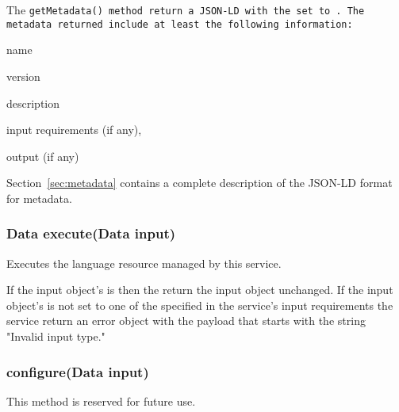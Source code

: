 The \tt{getMetadata()} method \should return a JSON-LD \payload with the \discriminator set to . The metadata returned \should include at least the following information:
\begin{listing}
	\item name
	\item version
	\item description
	\item input requirements (if any),
	\item output (if any)
\end{listing}
Section~\ref{sec:metadata} contains a complete description of the JSON-LD format for \lapps metadata.

\subsubsection{Data execute(Data input)}


Executes the language resource managed by this service.  

If the input \data object's \discriminator is  then the \service \must return the input object unchanged.  If the input \data object's \discriminator is not set to one of the specified in the service's input requirements the service \should return an error object with the payload that starts with the string "Invalid input type."

\subsubsection{configure(Data input)}

This method is reserved for future use.